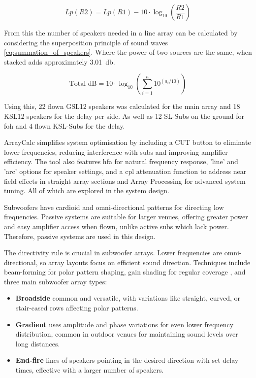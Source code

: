     \begin{equation}\label{eq:modified_inverse_square_law}
        Lp(R2) = Lp(R1) - 10 \cdot \log_{10}\left(\frac{R2}{R1}\right)
    \end{equation}

    From this the number of speakers needed in a line array can be calculated by considering the superposition principle of sound waves \eqref{eq:summation_of_speakers}. Where the power of two sources are the same, when stacked adds approximately \SI{3.01}{\decibel}.

    \begin{equation}\label{eq:summation_of_speakers}
        \text{Total dB} = 10 \cdot \log_{10}\left(\sum_{i=1}^{n} 10^{(a_i/10)}\right)
    \end{equation}

    Using this, 22 flown GSL12 speakers was calculated for the main array and 18 KSL12 speakers for the delay per side. As well as 12 SL-Subs on the ground for \gls{foh} and 4 flown KSL-Subs for the delay.
    
    ArrayCalc simplifies system optimisation by including a CUT button to eliminate lower frequencies, reducing interference with subs and improving amplifier efficiency. The tool also features \gls{hfa} for natural frequency response, 'line' and 'arc' options for speaker settings, and a \gls{cpl} attenuation function to address near field effects in straight array sections and Array Processing for advanced system tuning. All of which are explored in the system design.

    Subwoofers have cardioid and omni-directional patterns for directing low frequencies. Passive systems are suitable for larger venues, offering greater power and easy amplifier access when flown, unlike active subs which lack power. Therefore, passive systems are used in this design.

    The directivity rule is crucial in subwoofer arrays. Lower frequencies are omni-directional, so array layouts focus on efficient sound direction.
    Techniques include beam-forming for polar pattern shaping, gain shading for regular coverage \citep{jberryman2010}, and three main subwoofer array types: 
    
    \begin{itemize}
        \item \textbf{Broadside} common and versatile, with variations like straight, curved, or stair-cased rows affecting polar patterns.
        \item \textbf{Gradient} uses amplitude and phase variations for even lower frequency distribution, common in outdoor venues for maintaining sound levels over long distances.
        \item \textbf{End-fire} lines of speakers pointing in the desired direction with set delay times, effective with a larger number of speakers.
    \end{itemize}

